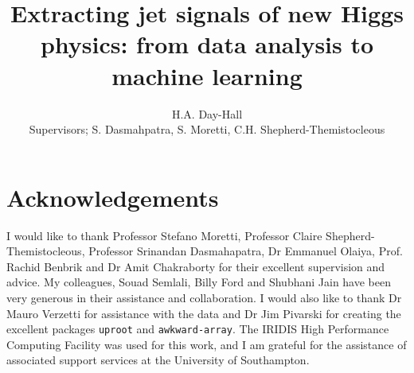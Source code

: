 \documentclass{article}
\begin{document}
\title{Extracting jet signals of new Higgs physics: from data analysis to machine learning}
\author{H.A. Day-Hall \\ {\small Supervisors; S. Dasmahpatra, S. Moretti, C.H. Shepherd-Themistocleous}}
	
	\maketitle
	
	\tableofcontents
    \FloatBarrier
     
    \FloatBarrier
    
    
    \FloatBarrier
    \FloatBarrier
    
    \FloatBarrier
    
    \FloatBarrier
    
    \FloatBarrier
    
    \FloatBarrier
    
    \FloatBarrier
    
    \FloatBarrier
    
    
    \section{Acknowledgements}
    I would like to thank Professor Stefano Moretti, Professor Claire Shepherd-Themistocleous, Professor Srinandan Dasmahapatra, Dr Emmanuel Olaiya, Prof. Rachid Benbrik and Dr Amit Chakraborty for their excellent supervision and advice.
    My colleagues, Souad Semlali, Billy Ford and Shubhani Jain have been very generous in their assistance and collaboration.
    I would also like to thank Dr Mauro Verzetti for assistance with the data and Dr Jim Pivarski for creating the excellent packages \lstinline{uproot} and \lstinline{awkward-array}.
    The IRIDIS High Performance Computing Facility was used for this work,
    and I am grateful for the assistance of associated support services at
    the University of Southampton.
    \printbibliography	
\end{document}
